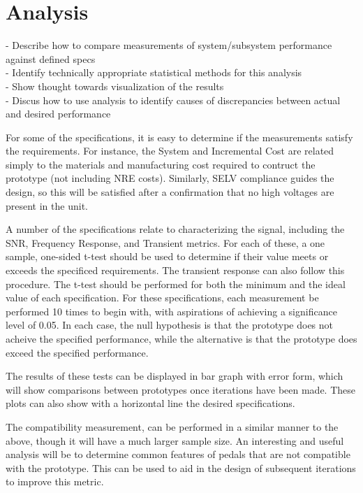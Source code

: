 \documentclass{article}
\begin{document}
\section{Analysis}
	- Describe how to compare measurements of system/subsystem performance against defined specs \\
	- Identify technically appropriate statistical methods for this analysis \\
	- Show thought towards visualization of the results \\
	- Discus how to use analysis to identify causes of discrepancies between actual and desired performance

	For some of the specifications, it is easy to determine if the measurements satisfy the requirements.  For instance, the System and Incremental Cost are related simply to the materials and manufacturing cost required to contruct the prototype (not including NRE costs).  Similarly, SELV compliance guides the design, so this will be satisfied after a confirmation that no high voltages are present in the unit.

	A number of the specifications relate to characterizing the signal, including the SNR, Frequency Response, and Transient metrics.  For each of these, a one sample, one-sided t-test should be used to determine if their value meets or exceeds the specificed requirements.  The transient response can also follow this procedure.  The t-test should be performed for both the minimum and the ideal value of each specification.  For these specifications, each measurement be performed 10 times to begin with, with aspirations of achieving a significance level of 0.05.  In each case, the null hypothesis is that the prototype does not acheive the specified performance, while the alternative is that the prototype does exceed the specified performance.

	The results of these tests can be displayed in bar graph with error form, which will show comparisons between prototypes once iterations have been made.  These plots can also show with a horizontal line the desired specifications.

	The compatibility measurement, can be performed in a similar manner to the above, though it will have a much larger sample size.  An interesting and useful analysis will be to determine common features of pedals that are not compatible with the prototype.  This can be used to aid in the design of subsequent iterations to improve this metric.
\end{document}
